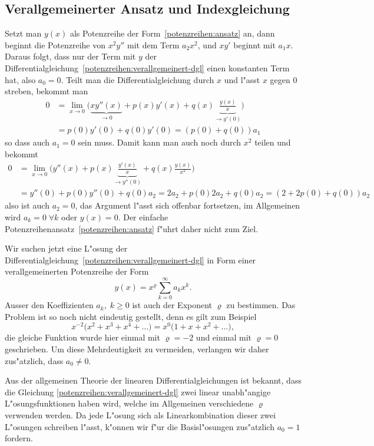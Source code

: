 \subsection{Verallgemeinerter Ansatz und Indexgleichung}
\label{subsection:potenzreihen:indexgleichung}
Setzt man $y(x)$ als Potenzreihe der Form~\eqref{potenzreihen:ansatz} an,
dann beginnt die Potenzreihe von $x^2y''$ mit dem Term $a_2x^2$,
und $xy'$ beginnt mit $a_1x$.
Daraus folgt, dass nur der Term mit $y$ der
Differentialgleichung~\eqref{potenzreihen:verallgemeinert-dgl}
einen konstanten Term hat, also $a_0=0$.
Teilt man die Differentialgleichung durch $x$ und l"asst $x$ gegen $0$
streben, bekommt man
\begin{align*}
0&=
\lim_{x\to 0}\biggl(
\underbrace{xy''(x)}_{\to 0}+p(x)y'(x)+q(x)\underbrace{\frac{y(x)}{x}}_{\displaystyle\to y'(0)}\biggr)
\\
&=
p(0)y'(0)+q(0)y'(0)
=(p(0)+q(0))a_1
\end{align*}
so dass auch $a_1=0$ sein muss.
Damit kann man auch noch durch $x^2$ teilen und bekommt
\begin{align*}
0&=
\lim_{x\to 0}\biggl(
y''(x)+p(x)\underbrace{\frac{y'(x)}{x}}_{\displaystyle\to y''(0)}+q(x)\frac{y(x)}{x^2}
\biggr)
\\
&=y''(0)+p(0)y''(0)+q(0)a_2
=2a_2+p(0)2a_2+q(0)a_2
=(2+2p(0)+q(0))a_2
\end{align*}
also ist auch $a_2=0$, das Argument l"asst sich offenbar fortsetzen, 
im Allgemeinen wird $a_k=0\;\forall k$ oder $y(x)=0$.
Der einfache Potenzreihenansatz~\eqref{potenzreihen:ansatz} f"uhrt
daher nicht zum Ziel.

Wir suchen jetzt eine L"osung der
Differentialgleichung~\eqref{potenzreihen:verallgemeinert-dgl}
in Form einer verallgemeinerten Potenzreihe der Form
\begin{equation}
y(x)=x^\varrho\sum_{k=0}^\infty a_kx^k.
\label{potenzreihen:verallgemeinert}
\end{equation}
%
%
Ausser den Koeffizienten $a_k,\;k\ge 0$ ist auch der Exponent
$\varrho$ zu bestimmen.
Das Problem ist so noch nicht eindeutig gestellt, denn es gilt zum Beispiel
\[
x^{-2}\bigl(x^2 + x^3 + x^4 + \dots\bigr)
=
x^{0}\bigl(1+x + x^2 + \dots\bigr),
\]
die gleiche Funktion wurde hier einmal mit $\varrho=-2$ und einmal
mit $\varrho=0$ geschrieben.
Um diese Mehrdeutigkeit zu vermeiden,
verlangen wir daher zus"atzlich, dass $a_0\ne 0$.

Aus der allgemeinen Theorie der linearen Differentialgleichungen
ist bekannt, dass die Gleichung \eqref{potenzreihen:verallgemeinert-dgl}
zwei linear unabh"angige L"osungsfunktionen haben wird,
welche im Allgemeinen verschiedene $\varrho$ verwenden werden.
Da jede L"osung sich als Linearkombination dieser zwei L"osungen schreiben
l"asst, k"onnen wir f"ur die Basisl"osungen zus"atzlich $a_0=1$ fordern.

